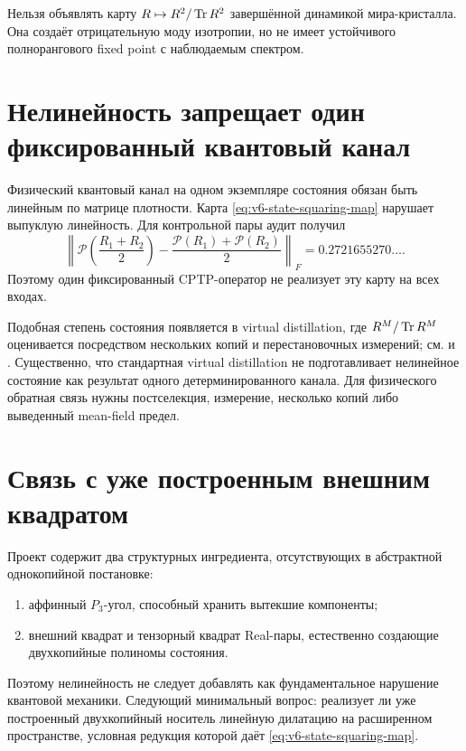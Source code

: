 \begin{nogocriterion}
Нельзя объявлять карту $R\mapsto R^2/\operatorname{Tr} R^2$ завершённой динамикой
мира-кристалла. Она создаёт отрицательную моду изотропии, но не имеет
устойчивого полнорангового fixed point с наблюдаемым спектром.
\end{nogocriterion}

\section{Нелинейность запрещает один фиксированный квантовый канал}

Физический квантовый канал на одном экземпляре состояния обязан быть
линейным по матрице плотности. Карта \eqref{eq:v6-state-squaring-map}
нарушает выпуклую линейность. Для контрольной пары аудит получил
\begin{equation}
 \left\|
 \mathcal P\left(\frac{R_1+R_2}{2}\right)
 -\frac{\mathcal P(R_1)+\mathcal P(R_2)}2
 \right\|_F
 =0.2721655270\ldots.
 \label{eq:v6-square-map-affinity-defect}
\end{equation}
Поэтому один фиксированный CPTP-оператор не реализует эту карту на всех
входах.

Подобная степень состояния появляется в virtual distillation, где
$R^M/\operatorname{Tr} R^M$ оценивается посредством нескольких копий и перестановочных
измерений; см.  и
. Существенно, что стандартная virtual
distillation не подготавливает нелинейное состояние как результат одного
детерминированного канала. Для физического обратная связь нужны постселекция,
измерение, несколько копий либо выведенный mean-field предел.

\section{Связь с уже построенным внешним квадратом}

Проект содержит два структурных ингредиента, отсутствующих в абстрактной
однокопийной постановке:
\begin{enumerate}
 \item аффинный $P_3$-угол, способный хранить вытекшие компоненты;
 \item внешний квадрат и тензорный квадрат Real-пары, естественно создающие
 двухкопийные полиномы состояния.
\end{enumerate}
Поэтому нелинейность не следует добавлять как фундаментальное нарушение
квантовой механики. Следующий минимальный вопрос: реализует ли уже
построенный двухкопийный носитель линейную дилатацию на расширенном
пространстве, условная редукция которой даёт \eqref{eq:v6-state-squaring-map}.

